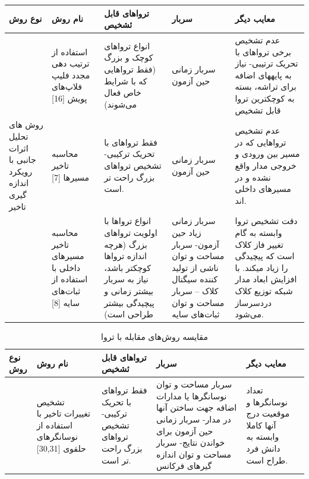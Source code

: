 \newpage
\begin{table}
	\begin{tabular}{|p{1cm}||p{3cm}|p{3cm}|p{3cm}|p{3cm}|}
نوع روش & نام روش  & تروا‌های قابل ئشخیص & سربار& معایب دیگر \\ \hline \hline
		& استفاده از ترتیب دهی مجدد فلیپ فلاپ‌های پویش [16] &انواع تروا‌های کوچک و بزرگ (فقط تروا‌هایی که با شرایط خاص فعال می‌شوند)  &سربار زمانی حین آزمون & عدم تشخیص برخی تروا‌های با تحریک ترتیبی- نیاز به پایه­های اضافه برای تراشه، بسته به کوچکترین تروا قابل تشخیص
		\\ \hline \hline
		
		روش ‌های تحلیل اثرات جانبی با رویکرد اندازه ‌گیری تاخیر& محاسبه تاخیر مسیرها [7] & فقط تروا‌های با تحریک ترکیبی- تشخیص تروا‌های بزرگ راحت تر است.& سربار زمانی حین آزمون&عدم تشخیص تروا‌هایی که در مسیر بین ورودی و خروجی مدار واقع نشده و در مسیرهای داخلی اند.
		\\ \cline{2-5}

		
		

		&محاسبه تاخیر مسیرهای داخلی با استفاده از ثبات‌های سایه [8]  &انواع تروا‌ها با اولویت تروا‌های بزرگ (هرچه اندازه تروا‌ها کوچکتر باشد، نیاز به سربار بیشتر زمانی و پیچیدگی بیشتر طراحی است) &سربار زمانی زیاد حین آزمون- سربار مساحت و توان ناشی از تولید کننده سیگنال کلاک – سربار مساحت و توان ثبات‌های سایه &دقت تشخیص تروا وابسته به گام تغییر فاز کلاک است که پیچیدگی را زیاد می­کند. با افزایش ابعاد مدار شبکه توزیع کلاک دردسرساز می‌شود.
		\end{tabular}
\end{table}
\newpage
\begin{table}
	\begin{tabular}{|p{1cm}||p{3cm}|p{3cm}|p{3cm}|p{3cm}|}
نوع روش & نام روش  & تروا‌های قابل ئشخیص & سربار& معایب دیگر \\ \hline \hline
		&تشخیص تغییرات تاخیر با استفاده از نوسانگرهای حلقوی [30,31]&فقط تروا‌های با تحریک ترکیبی- تشخیص تروا‌های بزرگ راحت تر است.&سربار مساحت و توان نوسانگرها یا مدارات اضافه جهت ساختن آنها در مدار-  سربار زمانی حین آزمون برای خواندن نتایج- سربار مساحت و توان اندازه گیرهای فرکانس&تعداد نوسانگرها و موقعیت درج آنها کاملا وابسته به دانش فرد طراح است.
		\\ \hline \hline
	\end{tabular}
		\caption{مقایسه روش‌های مقابله با تروا}
\end{table}

